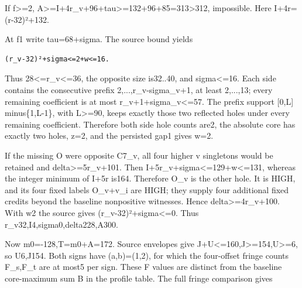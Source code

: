 \documentclass[10pt,a4paper]{article}
\theoremstyle{definition}
\begin{document}
If f\textgreater=\allowbreak{}2,\allowbreak{}
A\textgreater=\allowbreak{}I+\allowbreak{}4r\_\allowbreak{}v+\allowbreak{}96+\allowbreak{}tau\textgreater=\allowbreak{}132+\allowbreak{}96+\allowbreak{}85=\allowbreak{}313\textgreater312,\allowbreak{}
impossible. Here I+\allowbreak{}4r=\allowbreak{}(r-32)²+\allowbreak{}132.

At f1 write tau=\allowbreak{}68+\allowbreak{}sigma. The source bound yields

\begin{lstlisting}
(r_v-32)²+sigma<=2+w<=16.
\end{lstlisting}

Thus 28\textless=\allowbreak{}r\_\allowbreak{}v\textless=\allowbreak{}36,\allowbreak{} the opposite size is32..40,\allowbreak{} and
sigma\textless=\allowbreak{}16. Each side contains the consecutive prefix
2,\allowbreak{}...,\allowbreak{}r\_\allowbreak{}v-sigma\_\allowbreak{}v+\allowbreak{}1,\allowbreak{} at least 2,\allowbreak{}...,\allowbreak{}13; every remaining coefficient is
at most r\_\allowbreak{}v+\allowbreak{}1+\allowbreak{}sigma\_\allowbreak{}v\textless=\allowbreak{}57. The prefix support {[}0,\allowbreak{}L{]}
minus\{1,\allowbreak{}L-1\},\allowbreak{} with L\textgreater=\allowbreak{}90,\allowbreak{} keeps exactly those two reflected
holes under every remaining coefficient. Therefore both side hole counts
are2,\allowbreak{} the absolute core has exactly two holes,\allowbreak{} z=\allowbreak{}2,\allowbreak{} and the persisted
gap1 gives w=\allowbreak{}2.

If the missing O were opposite C7\_\allowbreak{}v,\allowbreak{} all four higher v singletons would
be retained and delta\textgreater=\allowbreak{}5r\_\allowbreak{}v+\allowbreak{}101. Then
I+\allowbreak{}5r\_\allowbreak{}v+\allowbreak{}sigma\textless=\allowbreak{}129+\allowbreak{}w\textless=\allowbreak{}131,\allowbreak{} whereas the integer minimum
of I+\allowbreak{}5r is164. Therefore O\_\allowbreak{}v is the other hole. It is HIGH,\allowbreak{} and its
four fixed labels O\_\allowbreak{}v+\allowbreak{}v\_\allowbreak{}i are HIGH; they supply four additional fixed
credits beyond the baseline nonpositive witnesses. Hence
delta\textgreater=\allowbreak{}4r\_\allowbreak{}v+\allowbreak{}100. With w2 the source gives
(r\_\allowbreak{}v-32)²+\allowbreak{}sigma\textless=\allowbreak{}0. Thus r\_\allowbreak{}v32,\allowbreak{}I4,\allowbreak{}sigma0,\allowbreak{}delta228,\allowbreak{}A300.

Now m0=\allowbreak{}-128,\allowbreak{}T=\allowbreak{}m0+\allowbreak{}A=\allowbreak{}172. Source envelopes give
J+\allowbreak{}U\textless=\allowbreak{}160,\allowbreak{}J\textgreater=\allowbreak{}154,\allowbreak{}U\textgreater=\allowbreak{}6,\allowbreak{} so U6,\allowbreak{}J154. Both
signs have (a,\allowbreak{}b)=\allowbreak{}(1,\allowbreak{}2),\allowbreak{} for which the four-offset fringe counts
F\_\allowbreak{}s,\allowbreak{}F\_\allowbreak{}t are at most5 per sign. These F values are distinct from the
baseline core-maximum sum B in the profile table. The full fringe
comparison gives
\end{document}
